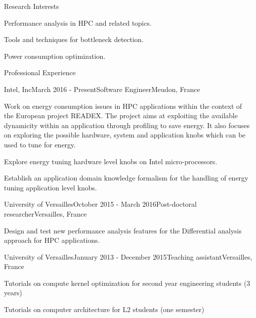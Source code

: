 \documentclass{resume} %
\begin{document}
\begin{rSection}{Research Interests}

\begin{rSubsection}{}{}{}{}
\item Performance analysis in HPC and related topics.
\item Tools and techniques for bottleneck detection.
\item Power consumption optimization.
\end{rSubsection}

\begin{rSection}{Professional Experience}

\begin{rSubsection}{Intel, Inc}{March 2016 - Present}{Software Engineer}{Meudon, France}
\item Work on energy consumption issues in HPC applications within the context 
      of the European project READEX. The project aims at exploiting the available dynamicity 
      within an application through profiling to save energy. It also focuses on exploring
      the possible hardware, system and application knobs which can be used to tune for energy.  
\item Explore energy tuning hardware level knobs on Intel micro-processors.
\item Establish an application domain knowledge formalism for the handling of energy tuning 
      application level knobs.         
\end{rSubsection}

\begin{rSubsection}{University of Versailles}{October 2015 - March 2016}{Post-doctoral researcher}{Versailles, France}
\item Design and test new performance analysis features for the Differential analysis approach for HPC applications.
\end{rSubsection}


\begin{rSubsection}{University of Versailles}{January 2013 - December 2015}{Teaching assistant}{Versailles, France}
\item Tutorials on compute kernel optimization for second year engineering students (3 years)
\item Tutorials on computer architecture for L2 students (one semester)  
\end{rSubsection}



\end{rSection}
\end{rSection}
\end{document}
